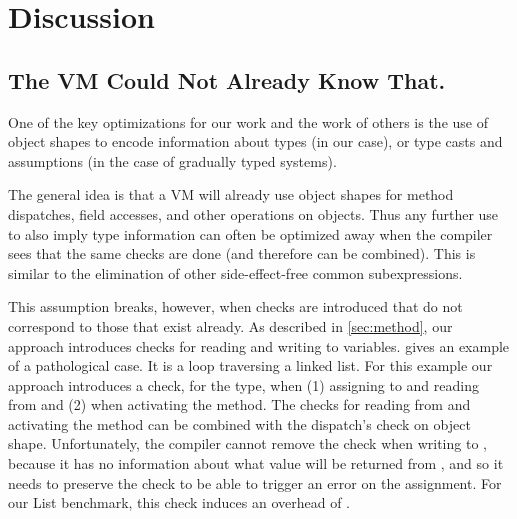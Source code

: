 
\section{Discussion}
\label{sec:discussion}

\subsection{The VM Could Not Already Know That.}
\label{sec:disc-pathological-case}



One of the key optimizations for our work
and the work of others\citep{Richards2017,Bauman2017}
is the use of object shapes
to encode information about types
(in our case),
or type casts and assumptions
(in the case of gradually typed systems).

The general idea is that a VM will already use object shapes
for method dispatches, field accesses, and other operations on objects.
Thus any further use to also imply type information
can often be optimized away
when the compiler sees that the same checks are done
(and therefore can be combined). This is similar to 
the elimination of other side-effect-free common subexpressions.

This assumption breaks, however, when checks are introduced
that do not correspond to those that exist already.
As described in \cref{sec:method},
our approach introduces checks for reading and writing to variables.
 gives an example of a pathological case.
It is a loop traversing a linked list.
For this example our approach 
introduces a check, for the  type,
when (1) assigning to and reading from  and
(2) when activating the  method.
The checks for reading from  and activating the method can be
combined with the dispatch's check on object shape.
%
Unfortunately, the compiler cannot remove the check
when writing to , because it has no information about
what value will be returned from , and so it needs to preserve the check to be able to trigger an error
on the assignment.
For our List benchmark, this check induces an overhead of \OverheadListP.

